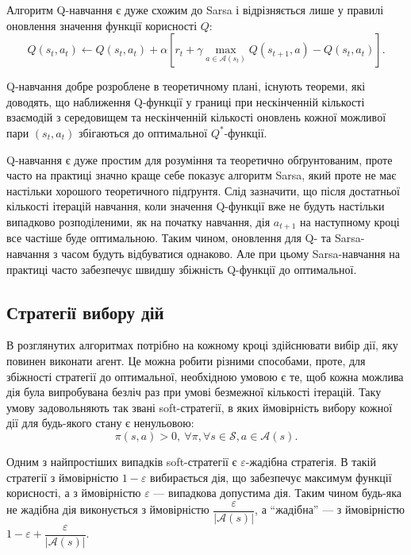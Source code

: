 \documentclass[a4paper,10pt,fleqn]{article}
\begin{document}
Алгоритм Q-навчання є дуже схожим до Sarsa і відрізняється лише у правилі оновлення значення функції корисності $Q$:
\begin{equation}
Q(s_t,a_t) \leftarrow Q(s_t, a_t) + \alpha \left[ r_t + \gamma \max_{a \in \mathcal{A}(s_t)} Q(s_{t+1}, a) - Q(s_t,a_t) \right].
\label{eq:q-update-rule}
\end{equation}

Q-навчання добре розроблене в теоретичному плані, існують теореми, які доводять, що наближення Q-функції у границі при нескінченній кількості взаємодій з середовищем та нескінченній кількості оновлень кожної можливої пари $(s_t,a_t)$ збігаються до оптимальної $Q^*$-функції. 

Q-навчання є дуже простим для розуміння та теоретично обґрунтованим, проте часто на практиці значно краще себе показує алгоритм Sarsa, який проте не має настільки хорошого теоретичного підґрунтя. Слід зазначити, що після достатньої кількості ітерацій навчання, коли значення Q-функції вже не будуть настільки випадково розподіленими, як на початку навчання, дія $a_{t+1}$ на наступному кроці все частіше буде оптимальною. Таким чином, оновлення для Q- та Sarsa-навчання з часом будуть відбуватися однаково. Але при цьому Sarsa-навчання на практиці часто забезпечує швидшу збіжність Q-функції до оптимальної.

\subsection{Стратегії вибору дій}
В розглянутих алгоритмах потрібно на кожному кроці здійснювати вибір дії, яку повинен виконати агент. Це можна робити різними способами, проте, для збіжності стратегії до оптимальної, необхідною умовою є те, щоб кожна можлива дія була випробувана безліч раз при умові безмежної кількості ітерацій. Таку умову задовольняють так звані soft-стратегії, в яких ймовірність вибору кожної дії для будь-якого стану є ненульовою:
\[
\pi(s,a)>0,\ \forall \pi, \forall s \in \mathcal{S}, a \in \mathcal{A}(s).
\]

Одним з найпростіших випадків soft-стратегії є $\varepsilon$-жадібна стратегія. В такій стратегії з ймовірністю $1-\varepsilon$ вибирається дія, що забезпечує максимум функції корисності, а з ймовірністю $\varepsilon$ --- випадкова допустима дія. Таким чином будь-яка не жадібна дія виконується з ймовірністю $\dfrac{\varepsilon}{|\mathcal{A}(s)|}$, а ``жадібна'' --- з ймовірністю $1 - \varepsilon + \dfrac{\varepsilon}{|\mathcal{A}(s)|}$.
\end{document}
